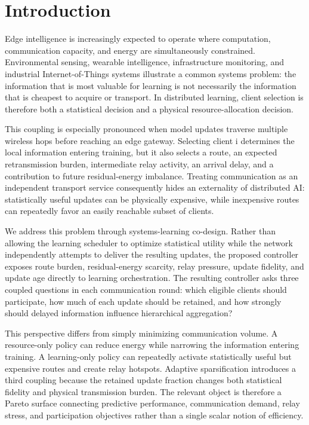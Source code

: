 \documentclass[11pt]{article}
\begin{document}
\section{Introduction}
Edge intelligence is increasingly expected to operate where computation, communication capacity, and energy are simultaneously constrained. Environmental sensing, wearable intelligence, infrastructure monitoring, and industrial Internet-of-Things systems illustrate a common systems problem: the information that is most valuable for learning is not necessarily the information that is cheapest to acquire or transport. In distributed learning, client selection is therefore both a statistical decision and a physical resource-allocation decision.\par
This coupling is especially pronounced when model updates traverse multiple wireless hops before reaching an edge gateway. Selecting client i determines the local information entering training, but it also selects a route, an expected retransmission burden, intermediate relay activity, an arrival delay, and a contribution to future residual-energy imbalance. Treating communication as an independent transport service consequently hides an externality of distributed AI: statistically useful updates can be physically expensive, while inexpensive routes can repeatedly favor an easily reachable subset of clients.\par
We address this problem through systems-learning co-design. Rather than allowing the learning scheduler to optimize statistical utility while the network independently attempts to deliver the resulting updates, the proposed controller exposes route burden, residual-energy scarcity, relay pressure, update fidelity, and update age directly to learning orchestration. The resulting controller asks three coupled questions in each communication round: which eligible clients should participate, how much of each update should be retained, and how strongly should delayed information influence hierarchical aggregation?\par
This perspective differs from simply minimizing communication volume. A resource-only policy can reduce energy while narrowing the information entering training. A learning-only policy can repeatedly activate statistically useful but expensive routes and create relay hotspots. Adaptive sparsification introduces a third coupling because the retained update fraction changes both statistical fidelity and physical transmission burden. The relevant object is therefore a Pareto surface connecting predictive performance, communication demand, relay stress, and participation objectives rather than a single scalar notion of efficiency.\par
\end{document}
